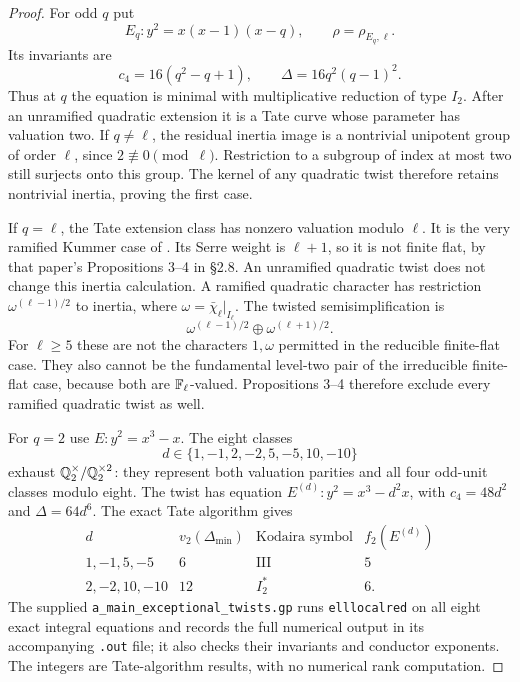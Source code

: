 \begin{proof}
For odd $q$ put
\[
 E_q:y^2=x(x-1)(x-q),\qquad \rho=\rho_{E_q,\ell}.
\]
Its invariants are
\[
 c_4=16(q^2-q+1),\qquad \Delta=16q^2(q-1)^2.
\]
Thus at $q$ the equation is minimal with multiplicative reduction of
type $I_2$. After an unramified quadratic extension it is a Tate curve
whose parameter has valuation two. If $q\ne\ell$, the residual
inertia image is a nontrivial unipotent group of order $\ell$, since
$2\not\equiv0\pmod\ell$. Restriction to a subgroup of index at most
two still surjects onto this group. The kernel of any quadratic twist
therefore retains nontrivial inertia, proving the first case.

If $q=\ell$, the Tate extension class has nonzero valuation modulo
$\ell$. It is the very ramified Kummer case of
\citet[\S2.4, especially (2.4.7)]{AMSerre1987}. Its Serre weight is
$\ell+1$, so it is not finite flat, by that paper's Propositions 3--4
in \S2.8. An unramified quadratic twist does not change this inertia
calculation. A ramified quadratic character has restriction
$\omega^{(\ell-1)/2}$ to inertia, where
$\omega=\bar\chi_\ell|_{I_\ell}$. The twisted semisimplification is
\[
 \omega^{(\ell-1)/2}\oplus\omega^{(\ell+1)/2}.
\]
For $\ell\ge5$ these are not the characters $1,\omega$ permitted in
the reducible finite-flat case. They also cannot be the fundamental
level-two pair of the irreducible finite-flat case, because both are
$\mathbb F_\ell$-valued. Propositions 3--4 therefore exclude every ramified
quadratic twist as well.

For $q=2$ use $E:y^2=x^3-x$. The eight classes
\[
 d\in\{1,-1,2,-2,5,-5,10,-10\}
\]
exhaust $\mathbb Q_2^\times/\mathbb Q_2^{\times2}$: they represent both valuation
parities and all four odd-unit classes modulo eight. The twist has
equation $E^{(d)}:y^2=x^3-d^2x$, with $c_4=48d^2$ and
$\Delta=64d^6$. The exact Tate algorithm gives
\[
 \begin{array}{c|c|c|c}
 d&v_2(\Delta_{\min})&\text{Kodaira symbol}&f_2(E^{(d)})\\\hline
 1,-1,5,-5&6&\mathrm{III}&5\\
 2,-2,10,-10&12&I_2^*&6.
 \end{array}
 \tag{A57.1}
\]
The supplied \texttt{a\_main\_exceptional\_twists.gp} runs
\texttt{elllocalred} \citep{AMPARI2026} on all eight exact integral equations and records
the full numerical output in its accompanying \texttt{.out} file;
it also checks their invariants and conductor exponents. The integers
are Tate-algorithm results, with no numerical rank computation.


\end{proof}
